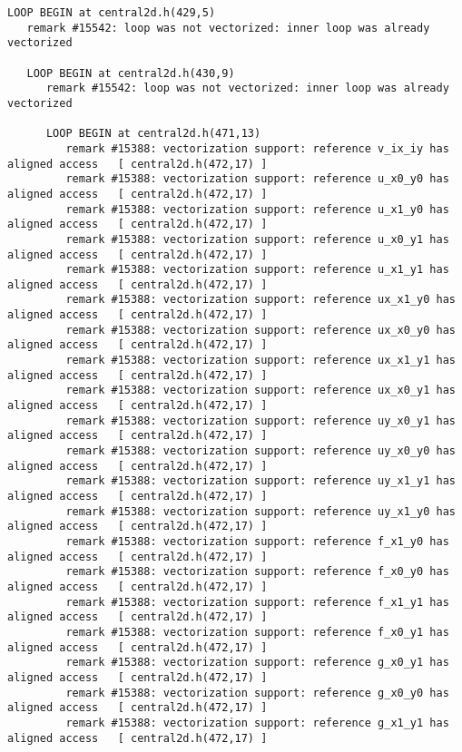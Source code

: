 {\tiny
\begin{lstlisting}
LOOP BEGIN at central2d.h(429,5)
   remark #15542: loop was not vectorized: inner loop was already vectorized

   LOOP BEGIN at central2d.h(430,9)
      remark #15542: loop was not vectorized: inner loop was already vectorized

      LOOP BEGIN at central2d.h(471,13)
         remark #15388: vectorization support: reference v_ix_iy has aligned access   [ central2d.h(472,17) ]
         remark #15388: vectorization support: reference u_x0_y0 has aligned access   [ central2d.h(472,17) ]
         remark #15388: vectorization support: reference u_x1_y0 has aligned access   [ central2d.h(472,17) ]
         remark #15388: vectorization support: reference u_x0_y1 has aligned access   [ central2d.h(472,17) ]
         remark #15388: vectorization support: reference u_x1_y1 has aligned access   [ central2d.h(472,17) ]
         remark #15388: vectorization support: reference ux_x1_y0 has aligned access   [ central2d.h(472,17) ]
         remark #15388: vectorization support: reference ux_x0_y0 has aligned access   [ central2d.h(472,17) ]
         remark #15388: vectorization support: reference ux_x1_y1 has aligned access   [ central2d.h(472,17) ]
         remark #15388: vectorization support: reference ux_x0_y1 has aligned access   [ central2d.h(472,17) ]
         remark #15388: vectorization support: reference uy_x0_y1 has aligned access   [ central2d.h(472,17) ]
         remark #15388: vectorization support: reference uy_x0_y0 has aligned access   [ central2d.h(472,17) ]
         remark #15388: vectorization support: reference uy_x1_y1 has aligned access   [ central2d.h(472,17) ]
         remark #15388: vectorization support: reference uy_x1_y0 has aligned access   [ central2d.h(472,17) ]
         remark #15388: vectorization support: reference f_x1_y0 has aligned access   [ central2d.h(472,17) ]
         remark #15388: vectorization support: reference f_x0_y0 has aligned access   [ central2d.h(472,17) ]
         remark #15388: vectorization support: reference f_x1_y1 has aligned access   [ central2d.h(472,17) ]
         remark #15388: vectorization support: reference f_x0_y1 has aligned access   [ central2d.h(472,17) ]
         remark #15388: vectorization support: reference g_x0_y1 has aligned access   [ central2d.h(472,17) ]
         remark #15388: vectorization support: reference g_x0_y0 has aligned access   [ central2d.h(472,17) ]
         remark #15388: vectorization support: reference g_x1_y1 has aligned access   [ central2d.h(472,17) ]

\end{lstlisting}}
